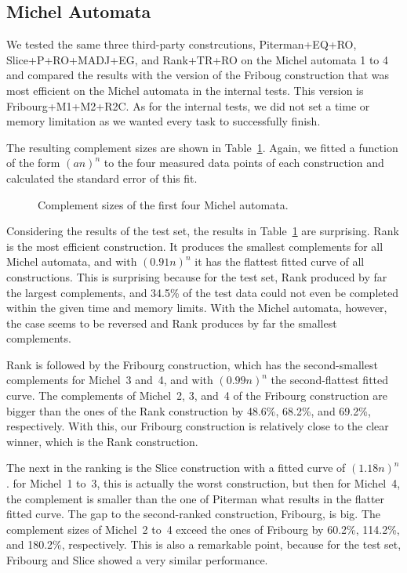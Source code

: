 \subsection{Michel Automata}
\label{5_external_michel}
We tested the same three third-party constrcutions, Piterman+EQ+RO, Slice+P+RO+MADJ+EG, and Rank+TR+RO on the Michel automata 1 to 4 and compared the results with the version of the Friboug construction that was most efficient on the Michel automata in the internal tests. This version is Fribourg+M1+M2+R2C. As for the internal tests, we did not set a time or memory limitation as we wanted every task to successfully finish.

The resulting complement sizes are shown in Table~\ref{e.m.states}. Again, we fitted a function of the form $(an)^n$ to the four measured data points of each construction and calculated the standard error of this fit.

\begin{figure}[ht]
\centering

\caption{Complement sizes of the first four Michel automata.}
\label{e.m.states}
\end{figure}

Considering the results of the \goal{} test set, the results in Table~\ref{e.m.states} are surprising. Rank is the most efficient construction. It produces the smallest complements for all Michel automata, and with $(0.91n)^n$ it has the flattest fitted curve of all constructions. This is surprising because for the \goal{} test set, Rank produced by far the largest complements, and 34.5\% of the test data could not even be completed within the given time and memory limits. With the Michel automata, however, the case seems to be reversed and Rank produces by far the smallest complements.

Rank is followed by the Fribourg construction, which has the second-smallest complements for Michel~3 and~4, and with $(0.99n)^n$ the second-flattest fitted curve. The complements of Michel~2, 3, and~4 of the Fribourg construction are bigger than the ones of the Rank construction by 48.6\%, 68.2\%, and 69.2\%, respectively. With this, our Fribourg construction is relatively close to the clear winner, which is the Rank construction.

The next in the ranking is the Slice construction with a fitted curve of $(1.18n)^n$. for Michel~1 to~3, this is actually the worst construction, but then for Michel~4, the complement is smaller than the one of Piterman what results in the flatter fitted curve. The gap to the second-ranked construction, Fribourg, is big. The complement sizes of Michel~2 to~4 exceed the ones of Fribourg by 60.2\%, 114.2\%, and 180.2\%, respectively. This is also a remarkable point, because for the \goal{} test set, Fribourg and Slice showed a very similar performance.

